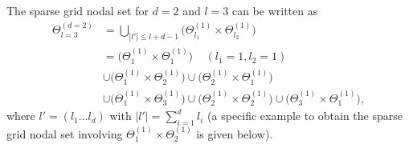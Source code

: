 \documentclass[letter,1p,11pt,oneside,onecolumn,sort&compress]{elsarticle}
\begin{document}
The sparse grid nodal set for $d=2$ and $l=3$ can be written as~\cite{smith2013uncertainty}
\begin{align}\label{eq:sparseNodes}
  \Theta_{l=3}^{(d=2)} &= \bigcup_{|l'| \leq l+d-1} \Big( \Theta_{l_1}^{(1)}  \times \Theta_{l_2}^{(1)}  \Big) \\ \nonumber
  &= \Big( \Theta_{1}^{(1)}  \times \Theta_{1}^{(1)}  \Big)  \ \ \ \ \ (l_1=1, l_2=1) \\ \nonumber
  &\cup \Big( \Theta_{1}^{(1)}  \times \Theta_{2}^{(1)}  \Big) \cup \Big( \Theta_{2}^{(1)}  \times \Theta_{1}^{(1)}  \Big)
  \\ \nonumber
  &\cup \Big( \Theta_{1}^{(1)}  \times \Theta_{3}^{(1)}  \Big)  \cup \Big( \Theta_{2}^{(1)}  \times \Theta_{2}^{(1)}  \Big)  \cup \Big( \Theta_{3}^{(1)}  \times \Theta_{1}^{(1)}  \Big),
\end{align}
where $l'=(l_1 \dots l_d)$ with $|l'| = \sum_{i=1}^d l_i$
(a specific example to obtain the sparse grid nodal set involving  $\Theta_{1}^{(1)} \times \Theta_{2}^{(1)}$ is given below).
%
\end{document}
